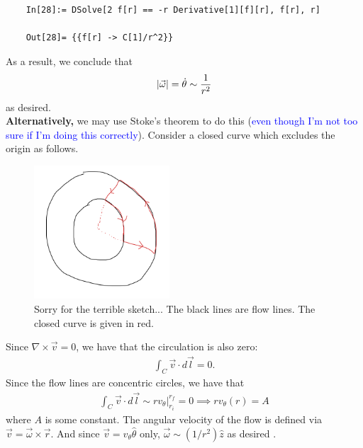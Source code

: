 \documentclass{article}
\theoremstyle{definition}
\newcommand{\f}[2]{\frac{#1}{#2}}
\begin{document}
\begin{enumerate}[label=(\alph*)]
\begin{lstlisting}
	In[28]:= DSolve[2 f[r] == -r Derivative[1][f][r], f[r], r]
	
	Out[28]= {{f[r] -> C[1]/r^2}}
	\end{lstlisting}
	As a result, we conclude that
	\begin{align*}
	\abs{\vec{\omega}} = \dot\theta \sim \f{1}{r^2} 
	\end{align*}
	as desired. \\
	
	
	\textbf{Alternatively,} we may use Stoke's theorem to do this (\textcolor{blue}{even though I'm not too sure if I'm doing this correctly}). Consider a closed curve which excludes the origin as follows. 
	\begin{figure}[!htb]
		\centering
		\includegraphics[width=0.45\textwidth]{curve.png}
		\caption{Sorry for the terrible sketch... The black lines are flow lines. The closed curve is given in red.}
	\end{figure}
	
	Since $\nabla \times \vec{v} = 0$, we have that the circulation is also zero:
	\begin{align*}
	\int_C \vec{v}\cdot d\vec{l} = 0.
	\end{align*}
	Since the flow lines are concentric circles, we have that 
	\begin{align*}
	\int_C \vec{v}\cdot d\vec{l} \sim  r  v_\theta \bigg\vert_{r_i}^{r_f} = 0 \implies  r v_\theta(r) = A 
	\end{align*}
	where $A$ is some constant. The angular velocity of the flow is defined via $\vec{v} = \vec{\omega} \times \vec{r}$. And since $\vec{v} = v_\theta \hat\theta$ only, $\vec{\omega} \sim (1/r^2) \hat{z}$ as desired .  
	
	
	

\end{enumerate}
\end{document}
